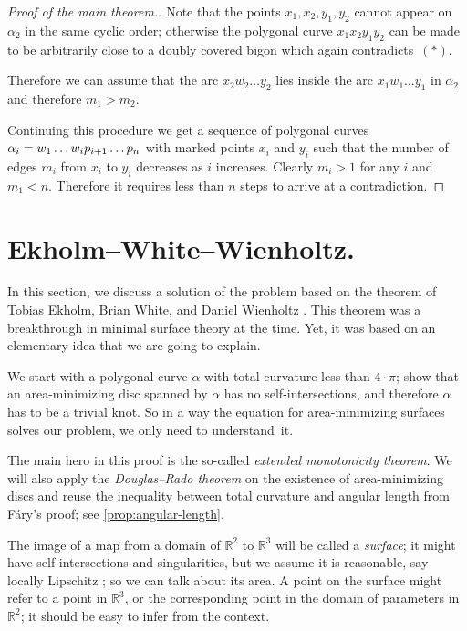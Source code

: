 \documentclass{article}
\newcommand*{\z}[1]{#1\nobreak\discretionary{}%
            {\hbox{$\mathsurround=0pt #1$}}{}}
\theoremstyle{theorem}
\newtheorem{Crofton-type formula}[theorem]{Crofton-type formula}
\newtheorem{Douglas--Rado theorem}[theorem]{Douglas--Rado theorem}
\newtheorem{Extended monotonicity theorem}[theorem]{Extended monotonicity theorem}
\theoremstyle{definition}
\begin{document}
\begin{proof}[Proof of the main theorem.]
Note that the points $x_1,x_2,y_1,y_2$ cannot appear on $\alpha_2$ in the same cyclic order;
otherwise the polygonal curve $x_1x_2y_1y_2$ can be made to be arbitrarily close to a doubly covered bigon which again contradicts~$({*})$.

Therefore we can assume that the arc $x_2w_2\dots y_2$ lies inside the arc $x_1w_1\dots y_1$ in $\alpha_2$
and therefore $m_1>m_2$.

Continuing this procedure we get a sequence of polygonal curves $\alpha_i\z=w_1\z\dots w_i p_{i+1}\z\dots p_n$ with marked points $x_i$ and $y_i$ such that the number of edges $m_i$ from $x_i$ to $y_i$ decreases as $i$ increases.
Clearly $m_i>1$ for any $i$ and $m_1<n$.
Therefore it requires less than $n$ steps to arrive at a contradiction.
\end{proof}

\section{Ekholm--White--Wienholtz.}

In this section, we discuss a solution of the problem based on the theorem of Tobias Ekholm, Brian White, and Daniel Wienholtz \cite{EWW_embed}.
This theorem was a breakthrough in minimal surface theory at the time.
Yet, it was based on an elementary idea that we are going to explain.

We start with a polygonal curve $\alpha$ with total curvature less than $4{\cdot}\pi$;
show that an area-minimizing disc spanned by $\alpha$ has no self-intersections, and therefore $\alpha$ has to be a trivial knot.
So in a way the equation for area-minimizing surfaces solves our problem, we only need to understand~it.

The main hero in this proof is the so-called \emph{extended monotonicity theorem}.
We will also apply the \emph{Douglas--Rado theorem} on the existence of area-minimizing discs and reuse the inequality between total curvature and angular length from Fáry's proof; see \ref{prop:angular-length}.

The image of a map from a domain of $\mathbb{R}^2$ to $\mathbb{R}^3$ will be called a \emph{surface};
it might have self-intersections and singularities, but we assume it is reasonable, say locally Lipschitz \cite{wiki:lipschitz}; so we can talk about its area.
A point on the surface might refer to a point in $\mathbb{R}^3$, or the corresponding point in the domain of parameters in $\mathbb{R}^2$;
it should be easy to infer from the context.
\end{document}
